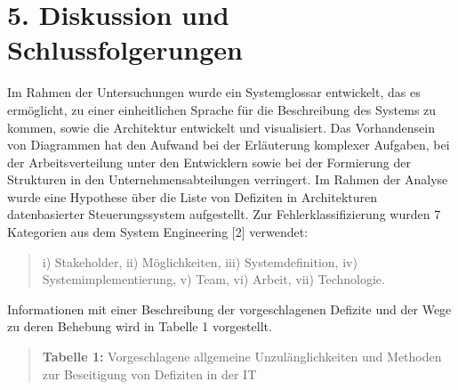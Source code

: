 \documentclass[11pt,a4paper]{article}
\begin{document}
\section*{5. Diskussion und Schlussfolgerungen}

Im Rahmen der Untersuchungen wurde ein Systemglossar entwickelt, das es
ermöglicht, zu einer einheitlichen Sprache für die Beschreibung des Systems zu
kommen, sowie die Architektur entwickelt und visualisiert.  Das Vorhandensein
von Diagrammen hat den Aufwand bei der Erläuterung komplexer Aufgaben, bei der
Arbeitsverteilung unter den Entwicklern sowie bei der Formierung der
Strukturen in den Unternehmensabteilungen verringert.  Im Rahmen der Analyse
wurde eine Hypothese über die Liste von Defiziten in Architekturen
datenbasierter Steuerungssystem aufgestellt.  Zur Fehlerklassifizierung wurden
7 Kategorien aus dem System Engineering [2] verwendet: 
\begin{quote}
  i) Stakeholder, ii) Möglichkeiten, iii) Systemdefinition, iv)
  Systemimplementierung, v) Team, vi) Arbeit, vii) Technologie.
\end{quote}
Informationen mit einer Beschreibung der vorgeschlagenen Defizite und der Wege
zu deren Behebung wird in Tabelle 1 vorgestellt.
\newpage

\begin{quote}
  \textbf{Tabelle 1:} Vorgeschlagene allgemeine Unzulänglichkeiten und
  Methoden zur Beseitigung von Defiziten in der IT
\end{quote}
\end{document}
